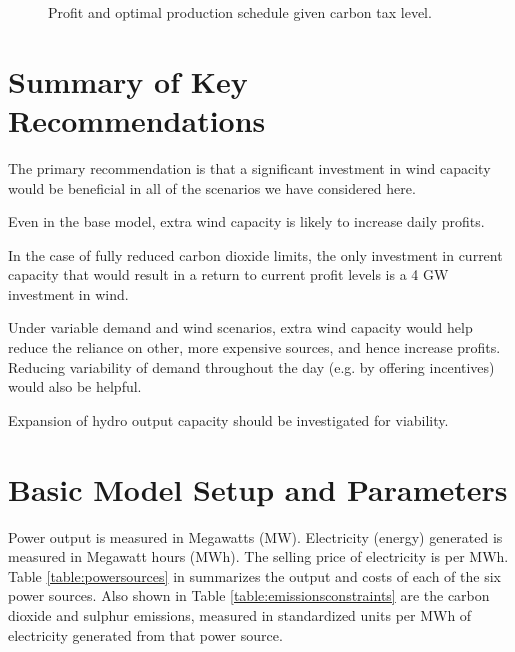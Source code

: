 \documentclass[twocolumn]{article}
\begin{document}
    \begin{figure}[!ht]
        \centering
        \caption{Profit and optimal production schedule given carbon tax level.\label{fig:carbon_tax}}
    \end{figure}
    
    
    
    \section{Summary of Key Recommendations}
    
    The primary recommendation is that a significant investment in wind capacity would be beneficial in all of the scenarios we have considered here.
    
    Even in the base model, extra wind capacity is likely to increase daily profits.
    
    In the case of fully reduced carbon dioxide limits, the only investment in current capacity that would result in a return to current profit levels is a 4 GW investment in wind.
    
    Under variable demand and wind scenarios, extra wind capacity would help reduce the reliance on other, more expensive sources, and hence increase profits.  Reducing variability of demand throughout the day (e.g. by offering incentives) would also be helpful.
    
    Expansion of hydro output capacity should be investigated for viability.
    
    
    \onecolumn
    
    \newpage
    
    \appendix
    
    
    \section{Basic Model Setup and Parameters}\label{sec:params}

	Power output is measured in Megawatts (MW). Electricity (energy) generated is measured in Megawatt hours (MWh). The selling price of electricity is  per MWh. Table \ref{table:powersources} in summarizes the output and costs of each of the six power sources. Also shown in Table \ref{table:emissionsconstraints} are the carbon dioxide and sulphur emissions, measured in standardized units per MWh of electricity generated from that power source.
\end{document}
